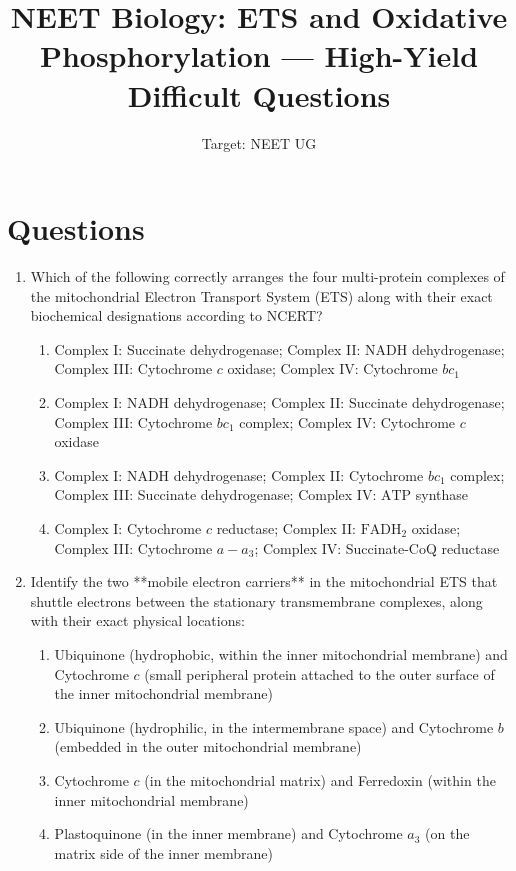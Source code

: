 \documentclass[11pt, a4paper]{article}
\title{\textbf{NEET Biology: ETS and Oxidative Phosphorylation — High-Yield Difficult Questions}}
\author{Target: NEET UG}
\date{}
\begin{document}
\maketitle

\section*{Questions}

\begin{enumerate}[label=\textbf{\arabic*.}]

\item Which of the following correctly arranges the four multi-protein complexes of the mitochondrial Electron Transport System (ETS) along with their exact biochemical designations according to NCERT?
\begin{enumerate}[label=(\Alph*)]
    \item Complex I: Succinate dehydrogenase; Complex II: $\text{NADH}$ dehydrogenase; Complex III: Cytochrome $c$ oxidase; Complex IV: Cytochrome $bc_1$
    \item Complex I: $\text{NADH}$ dehydrogenase; Complex II: Succinate dehydrogenase; Complex III: Cytochrome $bc_1$ complex; Complex IV: Cytochrome $c$ oxidase
    \item Complex I: $\text{NADH}$ dehydrogenase; Complex II: Cytochrome $bc_1$ complex; Complex III: Succinate dehydrogenase; Complex IV: $\text{ATP}$ synthase
    \item Complex I: Cytochrome $c$ reductase; Complex II: $\text{FADH}_2$ oxidase; Complex III: Cytochrome $a-a_3$; Complex IV: Succinate-CoQ reductase
\end{enumerate}

\item Identify the two **mobile electron carriers** in the mitochondrial ETS that shuttle electrons between the stationary transmembrane complexes, along with their exact physical locations:
\begin{enumerate}[label=(\Alph*)]
    \item Ubiquinone (hydrophobic, within the inner mitochondrial membrane) and Cytochrome $c$ (small peripheral protein attached to the outer surface of the inner mitochondrial membrane)
    \item Ubiquinone (hydrophilic, in the intermembrane space) and Cytochrome $b$ (embedded in the outer mitochondrial membrane)
    \item Cytochrome $c$ (in the mitochondrial matrix) and Ferredoxin (within the inner mitochondrial membrane)
    \item Plastoquinone (in the inner membrane) and Cytochrome $a_3$ (on the matrix side of the inner membrane)
\end{enumerate}


\end{enumerate}
\end{document}

